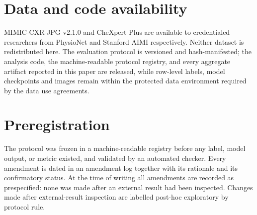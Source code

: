 \documentclass[11pt,a4paper]{article}
\begin{document}
\begin{abstract}
A pre-specified label-source sensitivity then reversed every cross-site
contrast while leaving every within-site contrast intact. Tracing that
dissociation established a second result: the CheXbert label sets derived from
the two report sections are not commensurable across these cohorts, differing
five-fold in labelling density and by \SI{35}{\percent} in positive rate. The
image-only control is decisive, producing bit-identical external predictions
under both label sources while its transfer gap changed sign. Cross-site
selective-error contrasts are therefore defined only relative to a label
source, which constrains this study's cross-site claims and, more generally,
any benchmark that compares these two cohorts under automatically derived
labels.
\end{abstract}








\section*{Data and code availability}

MIMIC-CXR-JPG v2.1.0 and CheXpert Plus are available to credentialed
researchers from PhysioNet and Stanford AIMI respectively. Neither dataset is
redistributed here. The evaluation protocol is versioned and hash-manifested;
the analysis code, the machine-readable protocol registry, and every aggregate
artifact reported in this paper are released, while row-level labels, model
checkpoints and images remain within the protected data environment required by
the data use agreements.

\section*{Preregistration}

The protocol was frozen in a machine-readable registry before any label, model
output, or metric existed, and validated by an automated checker. Every
amendment is dated in an amendment log together with its rationale and its
confirmatory status. At the time of writing all amendments are recorded as
prespecified: none was made after an external result had been inspected.
Changes made after external-result inspection are labelled post-hoc exploratory
by protocol rule.



\end{document}
